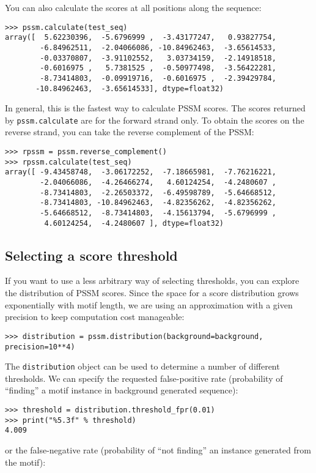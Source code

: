 You can also calculate the scores at all positions along the sequence:
\begin{verbatim}
>>> pssm.calculate(test_seq)
array([  5.62230396,  -5.6796999 ,  -3.43177247,   0.93827754,
        -6.84962511,  -2.04066086, -10.84962463,  -3.65614533,
        -0.03370807,  -3.91102552,   3.03734159,  -2.14918518,
        -0.6016975 ,   5.7381525 ,  -0.50977498,  -3.56422281,
        -8.73414803,  -0.09919716,  -0.6016975 ,  -2.39429784,
       -10.84962463,  -3.65614533], dtype=float32)
\end{verbatim}
In general, this is the fastest way to calculate PSSM scores.
The scores returned by \verb+pssm.calculate+ are for the forward strand
only. To obtain the scores on the reverse strand, you can take the reverse
complement of the PSSM:
\begin{verbatim}
>>> rpssm = pssm.reverse_complement()
>>> rpssm.calculate(test_seq)
array([ -9.43458748,  -3.06172252,  -7.18665981,  -7.76216221,
        -2.04066086,  -4.26466274,   4.60124254,  -4.2480607 ,
        -8.73414803,  -2.26503372,  -6.49598789,  -5.64668512,
        -8.73414803, -10.84962463,  -4.82356262,  -4.82356262,
        -5.64668512,  -8.73414803,  -4.15613794,  -5.6796999 ,
         4.60124254,  -4.2480607 ], dtype=float32)
\end{verbatim}

\subsection{Selecting a score threshold}

If you want to use a less arbitrary way of selecting thresholds, you
can explore the distribution of PSSM scores. Since the space for a score
distribution grows exponentially with motif length, we are using an
approximation with a given precision to keep computation cost manageable:

\begin{verbatim}
>>> distribution = pssm.distribution(background=background, precision=10**4)
\end{verbatim}
The \verb+distribution+ object can be used to determine a number of different thresholds.
We can specify the requested false-positive rate (probability of ``finding'' a motif instance in background generated sequence):

\begin{verbatim}
>>> threshold = distribution.threshold_fpr(0.01)
>>> print("%5.3f" % threshold)
4.009
\end{verbatim}
or the false-negative rate (probability of ``not finding'' an instance generated from the motif):

